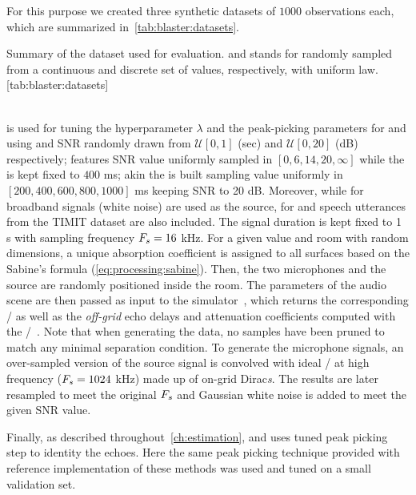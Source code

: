 \mynewline
For this purpose we created three synthetic datasets of $1000$ observations each, which are summarized in~\cref{tab:blaster:datasets}.
\begin{table}[ht]
    \begin{sidecaption}[]{
        Summary of the dataset used for evaluation.  and  stands for randomly sampled from a continuous and discrete set of values, respectively, with uniform law.
    }[tab:blaster:datasets]
    \centering
    \small
    
    \end{sidecaption}
\end{table}
\\\dsetValid{} is used for tuning the hyperparameter $\lambda$ and the peak-picking parameters for \algoCrocco{} and \algoBsn{} using \RT{} and SNR randomly drawn from $\mathcal{U}[0, 1]$ (sec) and $\mathcal{U}[0, 20]$ (dB) respectively; \dsetSNR{} features SNR value uniformly sampled in $[0, 6, 14, 20, \infty]$ while the \RT{} is kept fixed to $400$ ms; akin the \dsetRT{} is built sampling \RT{} value uniformly in $[200, 400, 600, 800, 1000]$ ms keeping SNR to 20 dB.
Moreover, while for \dsetValid{} broadband signals (white noise) are used as the source, for \dsetSNR{} and \dsetRT{} speech utterances from the TIMIT dataset are also included.
The signal duration is kept fixed to 1 s with sampling frequency $F_s = 16$ kHz.
For a given \RT{} value and room with random dimensions, a unique absorption coefficient is assigned to all surfaces based on the Sabine's formula (\cref{eq:processing:sabine}).
Then, the two microphones and the source are randomly positioned inside the room.
The parameters of the audio scene are then passed as input to the \pyroomacoustics{} simulator~, which returns the corresponding \RIRs/ as well as the \textit{off-grid} echo delays and attenuation coefficients computed with the \ISMdef/~.
Note that when generating the data, no samples have been pruned to match any minimal separation condition.
To generate the microphone signals, an over-sampled version of the source signal is convolved with ideal \RIRs/ at high frequency ($F_s=1024$ kHz) made up of on-grid Dirac\textit{s}.
The results are later resampled to meet the original $F_s$ and Gaussian white noise is added to meet the given SNR value.

\mynewline
Finally, as described throughout~\cref{ch:estimation}, \algoCrocco{} and \algoBsn{} uses tuned peak picking step to identity the echoes.
Here the same peak picking technique provided with reference implementation of these methods was used and tuned on a small validation set.


